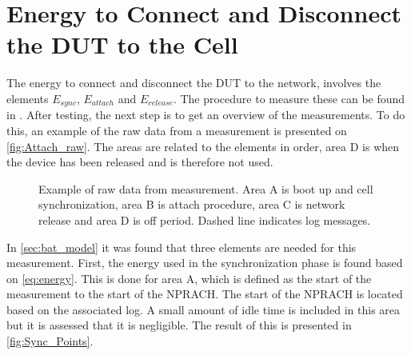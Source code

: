 \section{Energy to Connect and Disconnect the DUT to the Cell} \label{sec:performance_attach}

The energy to connect and disconnect the DUT to the network, involves the elements $E_{sync}$, $E_{attach}$ and $E_{release}$. The procedure to measure these can be found in . After testing, the next step is to get an overview of the measurements. To do this, an example of the raw data from a measurement is presented on \autoref{fig:Attach_raw}. The areas are related to the elements in order, area D is when the device has been released and is therefore not used.

\begin{figure}[H]
\centering
\begin{minipage}[tbp]{0.58\textwidth}
\resizebox{\textwidth}{!}{
}
\end{minipage}%
\begin{minipage}[tbp]{0.39\textwidth}
\end{minipage}
\caption{Example of raw data from measurement. Area A is boot up and cell synchronization, area B is attach procedure, area C is network release and area D is off period. Dashed line indicates log messages.}
\label{fig:Attach_raw}
\end{figure}

In \autoref{sec:bat_model} it was found that three elements are needed for this measurement. First, the energy used in the synchronization phase is found based on \autoref{eq:energy}. This is done for area A, which is defined as the start of the measurement to the start of the NPRACH. The start of the NPRACH is located based on the associated log. A small amount of idle time is included in this area but it is assessed that it is negligible. The result of this is presented in \autoref{fig:Sync_Points}. 




